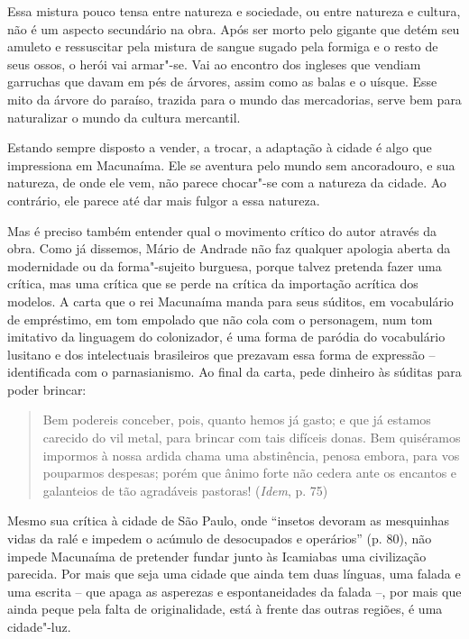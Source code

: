 Essa mistura pouco tensa entre natureza e sociedade, ou entre natureza e
cultura, não é um aspecto secundário na obra. Após ser morto pelo
gigante que detém seu amuleto e ressuscitar pela mistura de sangue
sugado pela formiga e o resto de seus ossos, o herói vai armar"-se. Vai
ao encontro dos ingleses que vendiam garruchas que davam em pés de
árvores, assim como as balas e o uísque. Esse mito da árvore do paraíso,
trazida para o mundo das mercadorias, serve bem para naturalizar o mundo
da cultura mercantil.

Estando sempre disposto a vender, a trocar, a adaptação à cidade é algo
que impressiona em Macunaíma. Ele se aventura pelo mundo sem
ancoradouro, e sua natureza, de onde ele vem, não parece chocar"-se com a
natureza da cidade. Ao contrário, ele parece até dar mais fulgor a essa
natureza.

Mas é preciso também entender qual o movimento crítico do autor através
da obra. Como já dissemos, Mário de Andrade não faz qualquer apologia
aberta da modernidade ou da forma"-sujeito burguesa, porque talvez
pretenda fazer uma crítica, mas uma crítica que se perde na crítica da
importação acrítica dos modelos. A carta que o rei Macunaíma manda para
seus súditos, em vocabulário de empréstimo, em tom empolado que não cola
com o personagem, num tom imitativo da linguagem do colonizador, é uma
forma de paródia do vocabulário lusitano e dos intelectuais brasileiros
que prezavam essa forma de expressão -- identificada com o
parnasianismo. Ao final da carta, pede dinheiro às súditas para poder
brincar:

\begin{quote}
Bem podereis conceber, pois, quanto hemos já gasto; e que já estamos
carecido do vil metal, para brincar com tais difíceis donas. Bem
quiséramos impormos à nossa ardida chama uma abstinência, penosa embora,
para vos pouparmos despesas; porém que ânimo forte não cedera ante os
encantos e galanteios de tão agradáveis pastoras! (\emph{Idem}, p. 75)
\end{quote}

Mesmo sua crítica à cidade de São Paulo, onde ``insetos devoram as
mesquinhas vidas da ralé e impedem o acúmulo de desocupados e
operários'' (p. 80), não impede Macunaíma de pretender fundar junto às
Icamiabas uma civilização parecida. Por mais que seja uma cidade que
ainda tem duas línguas, uma falada e uma escrita -- que apaga as
asperezas e espontaneidades da falada --, por mais que ainda peque pela
falta de originalidade, está à frente das outras regiões, é uma
cidade"-luz.

